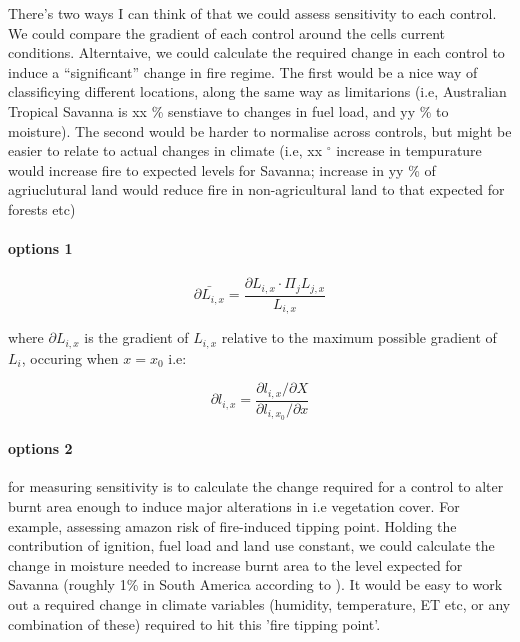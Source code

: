 \begin{shaded}
    There's two ways I can think of that we could assess sensitivity to each control. We could compare the gradient of each control around the cells current conditions. Alterntaive, we could calculate the required change in each control to induce a ``significant'' change in fire regime. The first would be a nice way of classificying different locations, along the same way as limitarions (i.e, Australian Tropical Savanna is xx \% senstiave to changes in fuel load, and yy \% to moisture). The second would be harder to normalise across controls, but might be easier to relate to actual changes in climate (i.e, xx $^{\circ}$ increase in tempurature would increase fire to expected levels for Savanna; increase in yy \% of agriuclutural land would reduce fire in non-agricultural land to that expected for forests etc)

\paragraph{options 1}

\begin{equation}
    \bar{\partial L_{i, x}} = \frac{\partial L_{i, x} \cdot \Pi_{j} L_{j, x}}{L_{i, x}}
\end{equation}

where $\partial L_{i, x}$ is the gradient of $L_{i, x}$ relative to the maximum possible gradient of $L_{i}$, occuring when $x = x_{0}$ i.e:

\begin{equation}
    \partial l_{i, x} = \frac{\partial l_{i, x} / \partial X}
                             {\partial l_{i, x_{0}} / \partial x}
\end{equation}

\paragraph{options 2}
for measuring sensitivity is to calculate the change required for a control to alter burnt area enough to induce major alterations in i.e vegetation cover.
For example, assessing amazon risk of fire-induced tipping point. Holding the contribution of ignition, fuel load and land use constant, we could calculate the change in moisture needed to increase burnt area to the level expected for Savanna (roughly 1\% in South America according to \cite{lehmann2011deciphering}).
It would be easy to work out a required change in climate variables (humidity, temperature, ET etc, or any combination of these) required to hit this 'fire tipping point'.

\end{shaded}
